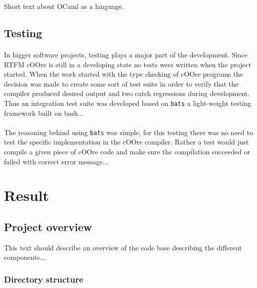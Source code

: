 \documentclass[paper=a4, fontsize=11pt]{article}
\numberwithin{equation}{section}	%
\numberwithin{figure}{section}		%
\numberwithin{table}{section}		%
\begin{document}
        Short text about OCaml as a language.
    
	\subsection {Testing}
	
	\paragraph {}
	    In bigger software projects, testing plays a major part of the development. Since RTFM cOOre is still in a developing state no tests were written when the project started. When the work started with the type checking of cOOre programs the decision was made to create some sort of test suite in order to verify that the compiler produced desired output and two catch regressions during development. Thus an integration test suite was developed based on \texttt{bats} a light-weight testing framework built on bash...
	
	\paragraph {}
	    The reasoning behind using \texttt{bats} was simple, for this testing there was no need to test the specific implementation in the cOOre compiler. Rather a test would just compile a given piece of cOOre code and make sure the compilation succeeded or failed with correct error message...

\section {Result}
	\subsection {Project overview}
	    This text should describe an overview of the code base describing the different components...
	    
	    \subsubsection{Directory structure}
    	
\end{document}
